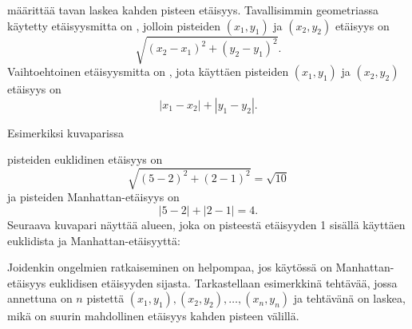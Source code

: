  määrittää tavan laskea kahden pisteen etäisyys.
Tavallisimmin geometriassa käytetty etäisyysmitta on
, jolloin pisteiden
$(x_1,y_1)$ ja $(x_2,y_2)$ etäisyys on
\[\sqrt{(x_2-x_1)^2+(y_2-y_1)^2}.\]
Vaihtoehtoinen etäisyysmitta on ,
jota käyttäen pisteiden
$(x_1,y_1)$ ja $(x_2,y_2)$ etäisyys on
\[|x_1-x_2|+|y_1-y_2|.\]
\begin{samepage}
Esimerkiksi kuvaparissa
\begin{center}
\end{center}
\end{samepage}
pisteiden euklidinen etäisyys on
\[\sqrt{(5-2)^2+(2-1)^2}=\sqrt{10}\]
ja pisteiden Manhattan-etäisyys on
\[|5-2|+|2-1|=4.\]
Seuraava kuvapari näyttää alueen, joka on pisteestä etäisyyden 1
sisällä käyttäen euklidista ja Manhattan-etäisyyttä:
\begin{center}
\end{center}
Joidenkin ongelmien ratkaiseminen on helpompaa, jos käytössä on
Manhattan-etäisyys euklidisen etäisyyden sijasta.
Tarkastellaan esimerkkinä tehtävää, jossa annettuna
on $n$ pistettä $(x_1,y_1),(x_2,y_2),\ldots,(x_n,y_n)$
ja tehtävänä on laskea, mikä on suurin mahdollinen etäisyys
kahden pisteen välillä.

